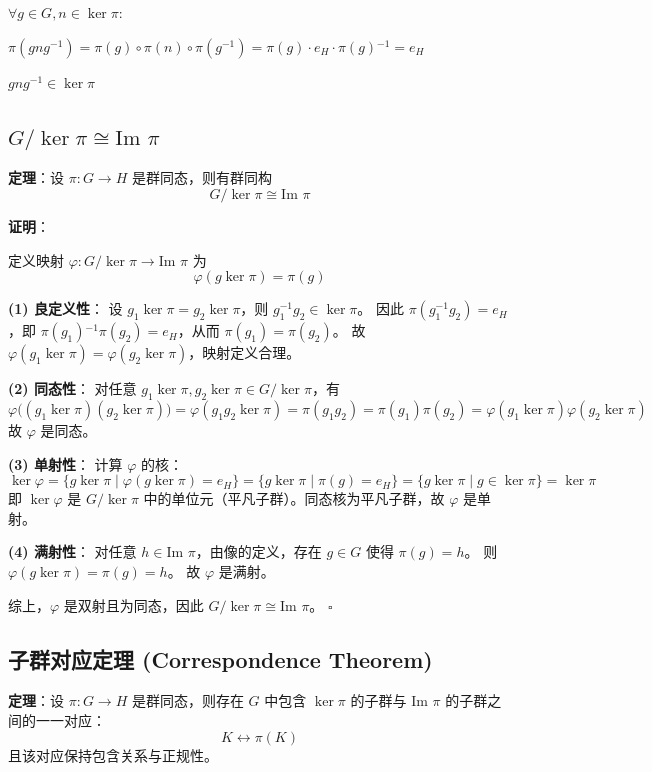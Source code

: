 \documentclass[12pt, a4paper]{article}
\begin{document}
$\forall g \in G, n \in \ker \pi$:

$\pi(gng^{-1}) = \pi(g) \circ \pi(n) \circ \pi(g^{-1}) = \pi(g) \cdot e_H \cdot \pi(g){}^{-1} = e_H$

$gng^{-1} \in \ker \pi$

\subsection*{\(G / \ker \pi \cong \text{Im } \pi\)}

\begin{mdframed}
\textbf{定理}：设 \(\pi: G \to H\) 是群同态，则有群同构
\[
G / \ker \pi \cong \text{Im } \pi
\]

\textbf{证明}：

定义映射 \(\varphi: G / \ker \pi \to \text{Im } \pi\) 为
\[
\varphi(g \ker \pi) = \pi(g)
\]

\textbf{(1) 良定义性}：
设 \(g_1 \ker \pi = g_2 \ker \pi\)，则 \(g_1^{-1}g_2 \in \ker \pi\)。
因此 \(\pi(g_1^{-1}g_2) = e_H\)，即 \(\pi(g_1){}^{-1}\pi(g_2) = e_H\)，从而 \(\pi(g_1) = \pi(g_2)\)。
故 \(\varphi(g_1 \ker \pi) = \varphi(g_2 \ker \pi)\)，映射定义合理。

\textbf{(2) 同态性}：
对任意 \(g_1 \ker \pi, g_2 \ker \pi \in G / \ker \pi\)，有
\[
\varphi\big((g_1 \ker \pi)(g_2 \ker \pi)\big) = \varphi(g_1 g_2 \ker \pi) = \pi(g_1 g_2) = \pi(g_1)\pi(g_2) = \varphi(g_1 \ker \pi) \varphi(g_2 \ker \pi)
\]
故 \(\varphi\) 是同态。

\textbf{(3) 单射性}：
计算 \(\varphi\) 的核：
\[
\ker \varphi = \{g \ker \pi \mid \varphi(g \ker \pi) = e_H\} = \{g \ker \pi \mid \pi(g) = e_H\} = \{g \ker \pi \mid g \in \ker \pi\} = \ker \pi
\]
即 \(\ker \varphi\) 是 \(G/\ker\pi\) 中的单位元（平凡子群）。同态核为平凡子群，故 \(\varphi\) 是单射。

\textbf{(4) 满射性}：
对任意 \(h \in \text{Im } \pi\)，由像的定义，存在 \(g \in G\) 使得 \(\pi(g) = h\)。
则 \(\varphi(g \ker \pi) = \pi(g) = h\)。
故 \(\varphi\) 是满射。

综上，\(\varphi\) 是双射且为同态，因此 \(G / \ker \pi \cong \text{Im } \pi\)。 \hfill \(\square\)
\end{mdframed}

\subsection*{子群对应定理 (Correspondence Theorem)}

\begin{mdframed}
\textbf{定理}：设 \(\pi: G \to H\) 是群同态，则存在 \(G\) 中包含 \(\ker \pi\) 的子群与 \(\text{Im } \pi\) 的子群之间的一一对应：
\[
K \longleftrightarrow \pi(K)
\]
且该对应保持包含关系与正规性。
\end{mdframed}
\end{document}
